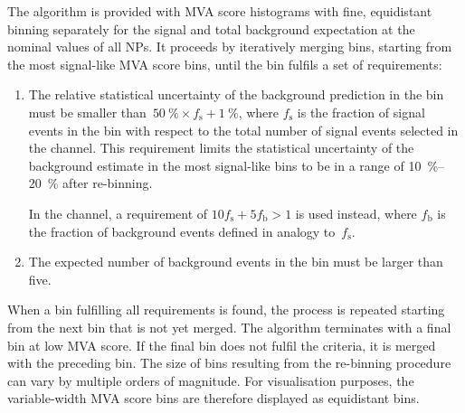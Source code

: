 The algorithm is provided with MVA score histograms with fine, equidistant
binning separately for the signal and total background expectation at the
nominal values of all NPs. It proceeds by iteratively merging bins, starting
from the most signal-like MVA score bins, until the bin fulfils a set of
requirements:
\begin{enumerate}

\item The relative statistical uncertainty of the background prediction in the
  bin must be smaller
  than~\mbox{$\SI{50}{\percent} \times f_\text{s} + \SI{1}{\percent}$}, where
  $f_\text{s}$ is the fraction of signal events in the bin with respect to the
  total number of signal events selected in the channel. This requirement limits
  the statistical uncertainty of the background estimate in the most signal-like
  bins to be in a range of \SIrange[range-units=single]{10}{20}{\percent} after re-binning.

  In the \lephad channel, a requirement of
  $10 f_{\text{s}} + 5 f_{\text{b}} > 1$ is used instead, where $f_{\text{b}}$
  is the fraction of background events defined in analogy to~$f_{\text{s}}$.


\item The expected number of background events in the bin must be larger than
  five.

\end{enumerate}
When a bin fulfilling all requirements is found, the process is repeated
starting from the next bin that is not yet merged. The algorithm terminates with
a final bin at low MVA score. If the final bin does not fulfil the criteria, it
is merged with the preceding bin.
The size of bins resulting from the re-binning procedure can vary by multiple
orders of magnitude. For visualisation purposes, the variable-width MVA score
bins are therefore displayed as equidistant bins.



